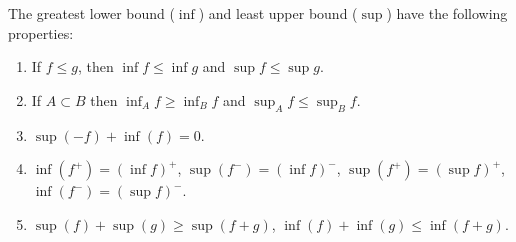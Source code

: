\begin{lemma} \label{L:infsup}
The greatest lower bound ($\inf$) and least upper bound ($\sup$) have the 
following properties:
\begin{enumerate}
  \item If $f\le g$, then $\inf f\le \inf g$ and $\sup f\le \sup g$.
  \item If $A\subset B$ then $\inf_A f\ge \inf_B f$ and $\sup_A f\le\sup_B f$.
  \item $\sup(-f) + \inf(f)=0$.
  \item $\inf(f^+)=(\inf f)^+$, $\sup(f^-)=(\inf f)^-$,
        $\sup(f^+)=(\sup f)^+$, $\inf(f^-)=(\sup f)^-$.
  \item $\sup(f)+\sup(g)\ge \sup(f+g)$, $\inf(f)+\inf(g)\le \inf(f+g)$.
\end{enumerate}
\end{lemma}

